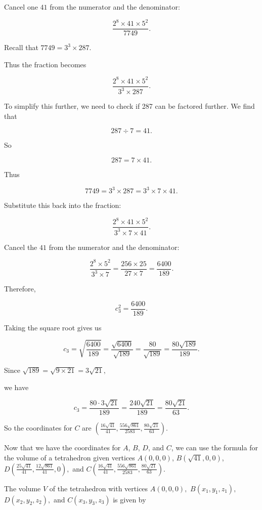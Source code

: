 Cancel one $41$ from the numerator and the denominator:

\[ \frac{2^8 \times 41 \times 5^2}{7749}. \]

Recall that $7749 = 3^3 \times 287.$

Thus the fraction becomes

\[ \frac{2^8 \times 41 \times 5^2}{3^3 \times 287}. \]

To simplify this further, we need to check if 287 can be factored further. We find that

\[ 287 \div 7 = 41. \]

So 

\[ 287 = 7 \times 41. \]

Thus 

\[ 7749 = 3^3 \times 287 = 3^3 \times 7 \times 41. \]

Substitute this back into the fraction:

\[ \frac{2^8 \times 41 \times 5^2}{3^3 \times 7 \times 41}. \]

Cancel the $41$ from the numerator and the denominator:

\[ \frac{2^8 \times 5^2}{3^3 \times 7} = \frac{256 \times 25}{27 \times 7} = \frac{6400}{189}. \]

Therefore,

\[ c_3^2 = \frac{6400}{189}. \]

Taking the square root gives us

\[ c_3 = \sqrt{\frac{6400}{189}} = \frac{\sqrt{6400}}{\sqrt{189}} = \frac{80}{\sqrt{189}} = \frac{80 \sqrt{189}}{189}. \]

Since $\sqrt{189} = \sqrt{9 \times 21} = 3 \sqrt{21},$

we have

\[ c_3 = \frac{80 \cdot 3 \sqrt{21}}{189} = \frac{240 \sqrt{21}}{189} = \frac{80 \sqrt{21}}{63}. \]

So the coordinates for $C$ are $\left(\frac{16 \sqrt{41}}{41}, \frac{556 \sqrt{861}}{2583}, \frac{80 \sqrt{21}}{63}\right).$

Now that we have the coordinates for $A$, $B$, $D$, and $C$, we can use the formula for the volume of a tetrahedron given vertices $A(0,0,0)$, $B(\sqrt{41},0,0)$, $D \left(\frac{25 \sqrt{41}}{41}, \frac{12 \sqrt{861}}{41}, 0\right),$ and $C \left(\frac{16 \sqrt{41}}{41}, \frac{556 \sqrt{861}}{2583}, \frac{80 \sqrt{21}}{63}\right).$

The volume $V$ of the tetrahedron with vertices $A(0,0,0),$ $B(x_1, y_1, z_1),$ $D(x_2, y_2, z_2),$ and $C(x_3, y_3, z_3)$ is given by

